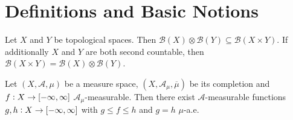 \section{Definitions and Basic Notions}

\begin{proposition}
	Let $X$ and $Y$ be topological spaces. Then $\mathcal{B}(X) \otimes \mathcal{B}(Y) \subseteq \mathcal{B}(X \times Y)$. If additionally $X$ and $Y$ are both second countable, then $\mathcal{B}(X\times Y) = \mathcal{B}(X) \otimes \mathcal{B}(Y)$.
\end{proposition}

\begin{proposition}
	Let $(X,\mathcal{A},\mu)$ be a measure space, $(X,\mathcal{A}_\mu,\overline{\mu})$ be its completion and $f: X \to \intcc[0]{-\infty,\infty}$ $\mathcal{A}_\mu$-measurable. Then there exist $\mathcal{A}$-measurable functions $g,h: X \to \intcc[0]{-\infty,\infty}$ with $g \leq f \leq h$ and $g = h$ $\mu$-a.e.
	\label{prop:approx_complete}
\end{proposition}


